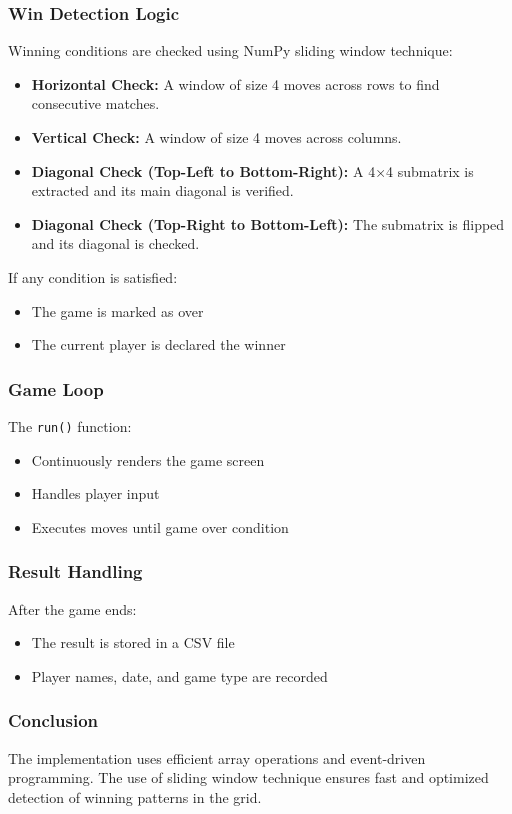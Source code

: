 \documentclass[12pt,letterpaper]{article}
\begin{document}
\subsubsection{Win Detection Logic}
Winning conditions are checked using NumPy sliding window technique:
\begin{itemize}
\item \textbf{Horizontal Check:}
A window of size 4 moves across rows to find consecutive matches.
\item \textbf{Vertical Check:}  
A window of size 4 moves across columns.
\item \textbf{Diagonal Check (Top-Left to Bottom-Right):}  
A 4×4 submatrix is extracted and its main diagonal is verified.
\item \textbf{Diagonal Check (Top-Right to Bottom-Left):}  
The submatrix is flipped and its diagonal is checked.
\end{itemize}
If any condition is satisfied:
\begin{itemize}
\item The game is marked as over
\item The current player is declared the winner
\end{itemize}
\subsubsection{Game Loop}
The \texttt{run()} function:
\begin{itemize}
\item Continuously renders the game screen
\item Handles player input
\item Executes moves until game over condition
\end{itemize}
\subsubsection{Result Handling}
After the game ends:
\begin{itemize}
\item The result is stored in a CSV file
\item Player names, date, and game type are recorded
\end{itemize}
\subsubsection{Conclusion}
The implementation uses efficient array operations and event-driven programming. The use of sliding window technique ensures fast and optimized detection of winning patterns in the grid.
\end{document}
